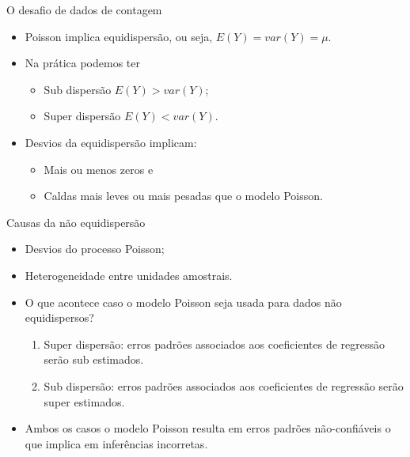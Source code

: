 \documentclass[10pt, aspectratio=169]{beamer}\usepackage[]{graphicx}\usepackage[]{color}
\begin{document}
\begin{frame}{O desafio de dados de contagem}
\begin{itemize}
\item Poisson implica equidispersão, ou seja, $ E(Y) = var(Y) = \mu. $
\vspace{0,5cm}
\item Na prática podemos ter
\begin{itemize}
  \item Sub dispersão $E(Y) > var(Y)$;
  \item Super dispersão $E(Y) < var(Y)$.
\end{itemize}
\vspace{0,5cm}
  \item Desvios da equidispersão implicam: 
  \begin{itemize}
    \item Mais ou menos zeros e
    \item Caldas mais leves ou mais pesadas que o modelo Poisson.
  \end{itemize}
\end{itemize}
\end{frame}

\begin{frame}{Causas da não equidispersão}
\begin{itemize}
\item Desvios do processo Poisson;
\item Heterogeneidade entre unidades amostrais.
\vspace{0,5cm}
\item O que acontece caso o modelo Poisson seja usada para dados não equidispersos?
\begin{enumerate}
  \item Super dispersão: erros padrões associados aos coeficientes de 
  regressão serão sub estimados.
  \item Sub dispersão: erros padrões associados aos coeficientes de 
  regressão serão super estimados.
\end{enumerate}
\vspace{0,5cm}
  \item Ambos os casos o modelo Poisson resulta em erros padrões 
  não-confiáveis o que implica em inferências incorretas.
  
\end{itemize}
\end{frame}
\end{document}

